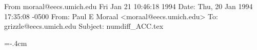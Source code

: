 From moraal@eecs.umich.edu Fri Jan 21 10:46:18 1994
Date: Thu, 20 Jan 1994 17:35:08 -0500
From: Paul E Moraal <moraal@eecs.umich.edu>
To: grizzle@eecs.umich.edu
Subject: numdiff_ACC.tex

\pagestyle{empty}
%
\textheight=24cm
\textwidth=17.7cm
\oddsidemargin=-.4cm
\columnsep=1.5cm
\topmargin=-2.716cm

\newcommand{\r}{\hbox{\sl l\kern-.2em R}}
\def\thesection{\arabic{section}}
\def\thesubsection{\thesection.\arabic{subsection}}
\def\theequation{\thesection.\arabic{equation}}
\def\theenumi{\roman{enumi}}\def\labelenumi{(\theenumi).}
\def\theenumii{\alph{enumii}}\def\labelenumii{(\theenumii)}
\newtheorem{theorem}{Theorem}[section]
\newtheorem{proof}{Proof:}
\def\theproof{}
\def\thetheorem{\thesection\arabic{theorem}}

\def\setR{\hbox{$l\! \! R$}}
\def\setN{\hbox{$l\! \! N$}}
\def\CN{{\cal N}}

\def \BA {{\bf A}}
\def \BB {{\bf B}}
\def \BC {{\bf C}}
\def \BE {{\bf E}}
\def \BF {{\bf F}}
\def \BG {{\bf G}}
\def \BH {{\bf H}}
\def \BI {{\bf I}}
\def \BJ {{\bf J}}
\def \Bk {{\bf k}}
\def \BK {{\bf K}}
\def \BL {{\bf L}}
\def \BM {{\bf M}}
\def \BN {{\bf N}}
\def \BQ {{\bf Q}}
\def \BP {{\bf P}}
\def \BQ {{\bf Q}}
\def \BR {{\bf R}}
\def \BS {{\bf S}}
\def \BV {{\bf V}}


\def\thesubsubsection{\thesubsection\arabic{subsubsection}.}


\makeatletter
\def\section{\@startsection{section}{1}{\z@}{\sectionspaceb
plus .5em minus .1em}{\sectionspacea plus 0em minus
.1em}{\centering\normalsize\bf}}

\def\subsection{\@startsection{subsection}{2}{\z@}{\sectionspaceb plus .5em minus
.1em}{\sectionspacea plus 0em minus .1em}{\normalsize\bf}}

